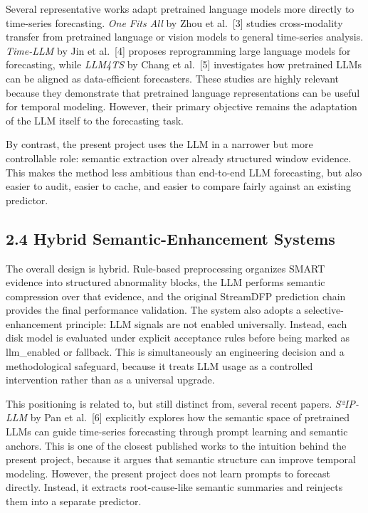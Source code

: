 \documentclass[
  11pt,
  a4paper]{article}
\begin{document}
Several representative works adapt pretrained language models more
directly to time-series forecasting. \emph{One Fits All} by Zhou et
al.~{[}3{]} studies cross-modality transfer from pretrained language or
vision models to general time-series analysis. \emph{Time-LLM} by Jin et
al.~{[}4{]} proposes reprogramming large language models for
forecasting, while \emph{LLM4TS} by Chang et al.~{[}5{]} investigates
how pretrained LLMs can be aligned as data-efficient forecasters. These
studies are highly relevant because they demonstrate that pretrained
language representations can be useful for temporal modeling. However,
their primary objective remains the adaptation of the LLM itself to the
forecasting task.

By contrast, the present project uses the LLM in a narrower but more
controllable role: semantic extraction over already structured window
evidence. This makes the method less ambitious than end-to-end LLM
forecasting, but also easier to audit, easier to cache, and easier to
compare fairly against an existing predictor.

\hypertarget{hybrid-semantic-enhancement-systems}{%
\subsection{2.4 Hybrid Semantic-Enhancement
Systems}\label{hybrid-semantic-enhancement-systems}}

The overall design is hybrid. Rule-based preprocessing organizes SMART
evidence into structured abnormality blocks, the LLM performs semantic
compression over that evidence, and the original StreamDFP prediction
chain provides the final performance validation. The system also adopts
a selective-enhancement principle: LLM signals are not enabled
universally. Instead, each disk model is evaluated under explicit
acceptance rules before being marked as llm\_enabled or fallback. This
is simultaneously an engineering decision and a methodological
safeguard, because it treats LLM usage as a controlled intervention
rather than as a universal upgrade.

This positioning is related to, but still distinct from, several recent
papers. \emph{S²IP-LLM} by Pan et al.~{[}6{]} explicitly explores how
the semantic space of pretrained LLMs can guide time-series forecasting
through prompt learning and semantic anchors. This is one of the closest
published works to the intuition behind the present project, because it
argues that semantic structure can improve temporal modeling. However,
the present project does not learn prompts to forecast directly.
Instead, it extracts root-cause-like semantic summaries and reinjects
them into a separate predictor.
\end{document}
